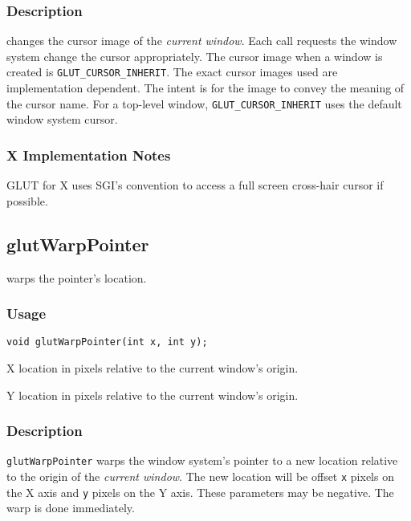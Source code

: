 \subsubsection*{Description}

 changes the cursor image of the {\em current window}.
Each call requests the window system change the cursor appropriately.
The cursor image when a window is created is {\tt GLUT\_CURSOR\_INHERIT}.
The exact cursor images used are implementation dependent.  The intent is
for the image to convey the meaning of the cursor name.
For a top-level window, {\tt GLUT\_CURSOR\_INHERIT} uses the default window
system cursor.

\subsubsection*{X Implementation Notes}

GLUT for X uses SGI's  convention
\cite{kilgard93-xsgi} to access a full screen cross-hair cursor if possible.

\subsection{glutWarpPointer}

 warps the pointer's location.

\subsubsection*{Usage}

\begin{verbatim}
void glutWarpPointer(int x, int y);
\end{verbatim}
\begin{description}
\itemsep 0in
\item[{\tt x}]
X location in pixels relative to the current window's origin.
\item[{\tt y}]
Y location in pixels relative to the current window's origin.
\end{description}

\subsubsection*{Description}

{\tt glutWarpPointer} warps the window system's pointer to a new location
relative to the origin of the {\em current window}.  The new location will
be offset {\tt x} pixels on the X axis and {\tt y} pixels on the Y axis.
These parameters may be negative.  The warp is done immediately.

